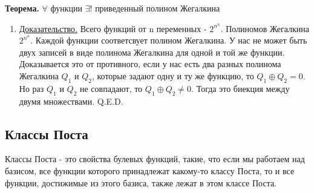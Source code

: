 \documentclass{article}
\begin{document}
\textbf{Теорема.}  $\forall$ функции $\exists!$ приведенный полином Жегалкина
\begin{enumerate}
\item[] \uline{Доказательство.}
Всего функций от n переменных - $2^{n^n}$. Полиномов Жегалкина  $2^{n^n}$. Каждой функции соответсвует полином Жегалкина. У нас не может быть двух записей в виде полинома Жегалкина для одной и той же функции. Доказывается это от противного, если у нас есть два разных полинома Жегалкина  $Q_1$ и $Q_2$, которые задают одну и ту же функцию, то $Q_1\oplus Q_2 = 0$. Но раз $Q_1$ и $Q_2$ не совпадают, то $Q_1\oplus Q_2\neq0$. Тогда это биекция между двумя множествами. Q.E.D.
\end{enumerate}



\subsection{Классы Поста}
Классы Поста - это свойства булевых функций, такие, что если мы работаем над базисом, все функции которого принадлежат какому-то классу Поста, то и все функции, достижимые из этого базиса, также лежат в этом классе Поста.
\end{document}
